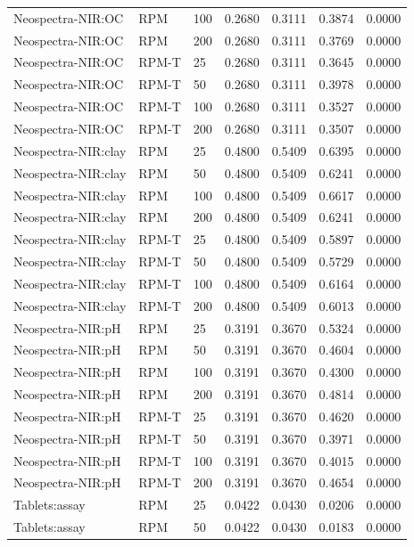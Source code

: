 \begin{tabular}{lllllll}
Neospectra-NIR:OC & RPM & 100 & 0.2680 & 0.3111 & 0.3874 & 0.0000 \\
Neospectra-NIR:OC & RPM & 200 & 0.2680 & 0.3111 & 0.3769 & 0.0000 \\
Neospectra-NIR:OC & RPM-T & 25 & 0.2680 & 0.3111 & 0.3645 & 0.0000 \\
Neospectra-NIR:OC & RPM-T & 50 & 0.2680 & 0.3111 & 0.3978 & 0.0000 \\
Neospectra-NIR:OC & RPM-T & 100 & 0.2680 & 0.3111 & 0.3527 & 0.0000 \\
Neospectra-NIR:OC & RPM-T & 200 & 0.2680 & 0.3111 & 0.3507 & 0.0000 \\
Neospectra-NIR:clay & RPM & 25 & 0.4800 & 0.5409 & 0.6395 & 0.0000 \\
Neospectra-NIR:clay & RPM & 50 & 0.4800 & 0.5409 & 0.6241 & 0.0000 \\
Neospectra-NIR:clay & RPM & 100 & 0.4800 & 0.5409 & 0.6617 & 0.0000 \\
Neospectra-NIR:clay & RPM & 200 & 0.4800 & 0.5409 & 0.6241 & 0.0000 \\
Neospectra-NIR:clay & RPM-T & 25 & 0.4800 & 0.5409 & 0.5897 & 0.0000 \\
Neospectra-NIR:clay & RPM-T & 50 & 0.4800 & 0.5409 & 0.5729 & 0.0000 \\
Neospectra-NIR:clay & RPM-T & 100 & 0.4800 & 0.5409 & 0.6164 & 0.0000 \\
Neospectra-NIR:clay & RPM-T & 200 & 0.4800 & 0.5409 & 0.6013 & 0.0000 \\
Neospectra-NIR:pH & RPM & 25 & 0.3191 & 0.3670 & 0.5324 & 0.0000 \\
Neospectra-NIR:pH & RPM & 50 & 0.3191 & 0.3670 & 0.4604 & 0.0000 \\
Neospectra-NIR:pH & RPM & 100 & 0.3191 & 0.3670 & 0.4300 & 0.0000 \\
Neospectra-NIR:pH & RPM & 200 & 0.3191 & 0.3670 & 0.4814 & 0.0000 \\
Neospectra-NIR:pH & RPM-T & 25 & 0.3191 & 0.3670 & 0.4620 & 0.0000 \\
Neospectra-NIR:pH & RPM-T & 50 & 0.3191 & 0.3670 & 0.3971 & 0.0000 \\
Neospectra-NIR:pH & RPM-T & 100 & 0.3191 & 0.3670 & 0.4015 & 0.0000 \\
Neospectra-NIR:pH & RPM-T & 200 & 0.3191 & 0.3670 & 0.4654 & 0.0000 \\
Tablets:assay & RPM & 25 & 0.0422 & 0.0430 & 0.0206 & 0.0000 \\
Tablets:assay & RPM & 50 & 0.0422 & 0.0430 & 0.0183 & 0.0000 \\

\end{tabular}
